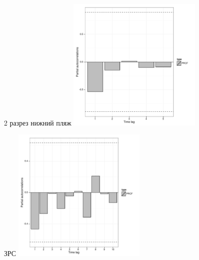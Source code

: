 \documentclass[12pt, a4paper]{disser}
\begin{document}
\begin{figure}[ht]
	\begin{minipage}[b]{.46\linewidth}
	\begin{center}
	{\tiny 2 разрез нижний пляж}
	\includegraphics[width=65mm]{../White_Sea/dynamic_N_N1/PRCF_razrez2_low_beatch_.pdf}
	\end{center}
	\end{minipage}
%
	\hfil %
%
	\begin{minipage}[b]{.46\linewidth}
	\begin{center}	
	{\tiny ЗРС}
	\includegraphics[width=65mm]{../White_Sea/dynamic_N_N1/PRCF_ZRS_.pdf}
	\end{center}
	\end{minipage}



\end{figure}
\end{document}
